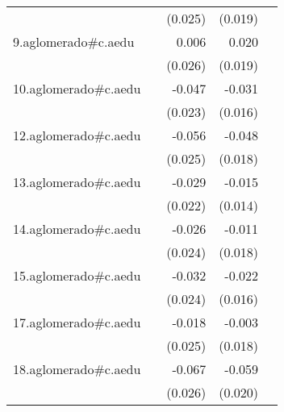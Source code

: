 {\begin{longtable}{l*{4}{D{.}{.}{-1}}}
            &                     &     (0.025)         &     (0.019)         &                     \\
\addlinespace
9.aglomerado#c.aedu&                     &       0.006         &       0.020         &                     \\
            &                     &     (0.026)         &     (0.019)         &                     \\
\addlinespace
10.aglomerado#c.aedu&                     &      -0.047\sym{*}  &      -0.031         &                     \\
            &                     &     (0.023)         &     (0.016)         &                     \\
\addlinespace
12.aglomerado#c.aedu&                     &      -0.056\sym{*}  &      -0.048\sym{**} &                     \\
            &                     &     (0.025)         &     (0.018)         &                     \\
\addlinespace
13.aglomerado#c.aedu&                     &      -0.029         &      -0.015         &                     \\
            &                     &     (0.022)         &     (0.014)         &                     \\
\addlinespace
14.aglomerado#c.aedu&                     &      -0.026         &      -0.011         &                     \\
            &                     &     (0.024)         &     (0.018)         &                     \\
\addlinespace
15.aglomerado#c.aedu&                     &      -0.032         &      -0.022         &                     \\
            &                     &     (0.024)         &     (0.016)         &                     \\
\addlinespace
17.aglomerado#c.aedu&                     &      -0.018         &      -0.003         &                     \\
            &                     &     (0.025)         &     (0.018)         &                     \\
\addlinespace
18.aglomerado#c.aedu&                     &      -0.067\sym{*}  &      -0.059\sym{**} &                     \\
            &                     &     (0.026)         &     (0.020)         &                     \\

\end{longtable}}
